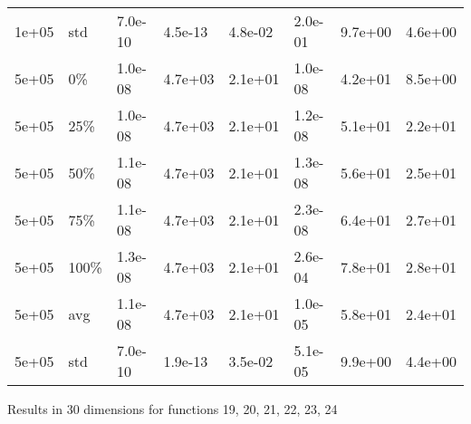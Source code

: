 \documentclass[11pt]{article}
\begin{document}
\begin{longtable}{llllllll}
  1e+05 & std & 7.0e-10 & 4.5e-13 & 4.8e-02 & 2.0e-01 & 9.7e+00 & 4.6e+00 \\ 
  5e+05 & 0\% & 1.0e-08 & 4.7e+03 & 2.1e+01 & 1.0e-08 & 4.2e+01 & 8.5e+00 \\ 
  5e+05 & 25\% & 1.0e-08 & 4.7e+03 & 2.1e+01 & 1.2e-08 & 5.1e+01 & 2.2e+01 \\ 
  5e+05 & 50\% & 1.1e-08 & 4.7e+03 & 2.1e+01 & 1.3e-08 & 5.6e+01 & 2.5e+01 \\ 
  5e+05 & 75\% & 1.1e-08 & 4.7e+03 & 2.1e+01 & 2.3e-08 & 6.4e+01 & 2.7e+01 \\ 
  5e+05 & 100\% & 1.3e-08 & 4.7e+03 & 2.1e+01 & 2.6e-04 & 7.8e+01 & 2.8e+01 \\ 
  5e+05 & avg & 1.1e-08 & 4.7e+03 & 2.1e+01 & 1.0e-05 & 5.8e+01 & 2.4e+01 \\ 
  5e+05 & std & 7.0e-10 & 1.9e-13 & 3.5e-02 & 5.1e-05 & 9.9e+00 & 4.4e+00 \\ 
   \hline
\hline
\end{longtable}
\newpage
Results in 30 dimensions for functions 19, 20, 21, 22, 23, 24
\end{document}

